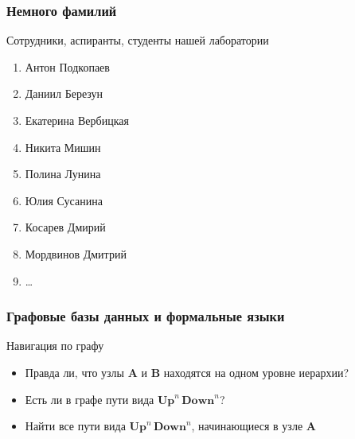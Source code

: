 \documentclass[xcolor=table]{beamer}
\begin{document}
\begin{frame}[fragile] \frametitle{Немного фамилий}
Сотрудники, аспиранты, студенты нашей лаборатории
    \begin{enumerate}
      \item Антон Подкопаев
      \item Даниил Березун
      \item Екатерина Вербицкая
      \item Никита Мишин
      \item Полина Лунина
      \item Юлия Сусанина
      \item Косарев Дмирий
      \item Мордвинов Дмитрий
      \item \dots
    \end{enumerate}
\end{frame}


\begin{frame}[fragile] \frametitle{Графовые базы данных и формальные языки}
  \begin{minipage}[m]{0.45\linewidth}
  \end{minipage}\hfill
  \begin{minipage}[m]{0.5\linewidth}
  Навигация по графу
  \begin{itemize}
        \item Правда ли, что узлы \textbf{A} и \textbf{B} находятся на одном уровне иерархии?
        \item Есть ли в графе пути вида $\textbf{Up}^n \, \textbf{Down}^n$?
        \item Найти все пути вида $\textbf{Up}^n \, \textbf{Down}^n$, начинающиеся в узле \textbf{A}
  \end{itemize}

  \end{minipage}
\end{frame}
\end{document}
